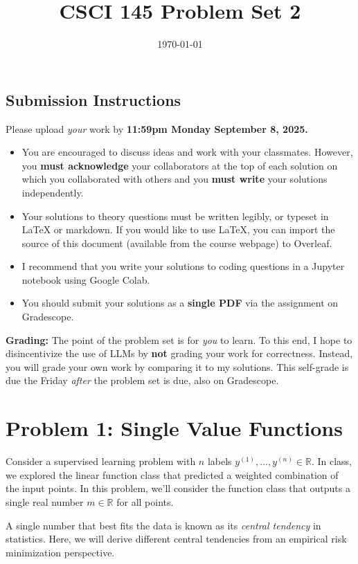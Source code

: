 \documentclass{article}
\title{CSCI 145 Problem Set 2}
\author{} %
\date{\today}
\begin{document}
\maketitle

\subsection*{Submission Instructions}

Please upload \textit{your} work by
\textbf{11:59pm Monday September 8, 2025.}
\begin{itemize}
\item You are encouraged to discuss ideas
and work with your classmates. However, you
\textbf{must acknowledge} your collaborators
at the top of each solution on which
you collaborated with others 
and you \textbf{must write} your solutions
independently.
\item Your solutions to theory questions must
be written legibly, or typeset in LaTeX or markdown.
If you would like to use LaTeX, you can import the source of this document (available from the course webpage) to Overleaf.
\item I recommend that you write your solutions to coding questions in a Jupyter notebook using Google Colab.
\item You should submit your solutions as a \textbf{single PDF} via the assignment on Gradescope.
\end{itemize}

\noindent
\textbf{Grading:} The point of the problem set is for \textit{you} to learn. To this end, I hope to disincentivize the use of LLMs by \textbf{not} grading your work for correctness. Instead, you will grade your own work by comparing it to my solutions. This self-grade is due the Friday \textit{after} the problem set is due, also on Gradescope.

\newpage \section*{Problem 1: Single Value Functions}

Consider a supervised learning problem with $n$ labels $y^{(1)}, \ldots, y^{(n)} \in \mathbb{R}$.
In class, we explored the linear function class that predicted a weighted combination of the input points.
In this problem, we'll consider the function class that outputs a single real number $m \in \mathbb{R}$ for all points.


A single number that best fits the data is known as its \textit{central tendency} in statistics.
Here, we will derive different central tendencies from an empirical risk minimization perspective.
\end{document}

